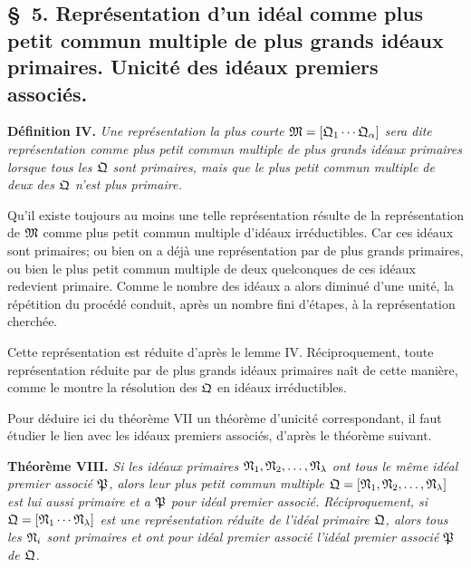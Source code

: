 \subsection*{\S~5. Représentation d'un idéal comme plus petit commun multiple de plus grands idéaux primaires. Unicité des idéaux premiers associés.}

\textbf{Définition IV.} \emph{Une représentation la plus courte $\mathfrak{M}=[\mathfrak{Q}_1\cdots\mathfrak{Q}_\alpha]$ sera dite représentation comme plus petit commun multiple de plus grands idéaux primaires lorsque tous les $\mathfrak{Q}$ sont primaires, mais que le plus petit commun multiple de deux des $\mathfrak{Q}$ n'est plus primaire.}

Qu'il existe toujours au moins une telle représentation résulte de la représentation de $\mathfrak{M}$ comme plus petit commun multiple d'idéaux irréductibles. Car ces idéaux sont primaires; ou bien on a déjà une représentation par de plus grands primaires, ou bien le plus petit commun multiple de deux quelconques de ces idéaux redevient primaire. Comme le nombre des idéaux a alors diminué d'une unité, la répétition du procédé conduit, après un nombre fini d'étapes, à la représentation cherchée.

Cette représentation est réduite d'après le lemme IV. Réciproquement, toute représentation réduite par de plus grands idéaux primaires naît de cette manière, comme le montre la résolution des $\mathfrak{Q}$ en idéaux irréductibles.

Pour déduire ici du théorème VII un théorème d'unicité correspondant, il faut étudier le lien avec les idéaux premiers associés, d'après le théorème suivant.

\textbf{Théorème VIII.} \emph{Si les idéaux primaires $\mathfrak{N}_1,\mathfrak{N}_2,\ldots,\mathfrak{N}_\lambda$ ont tous le même idéal premier associé $\mathfrak{P}$, alors leur plus petit commun multiple $\mathfrak{Q}=[\mathfrak{N}_1,\mathfrak{N}_2,\ldots,\mathfrak{N}_\lambda]$ est lui aussi primaire et a $\mathfrak{P}$ pour idéal premier associé. Réciproquement, si $\mathfrak{Q}=[\mathfrak{N}_1\cdots\mathfrak{N}_\lambda]$ est une représentation réduite de l'idéal primaire $\mathfrak{Q}$, alors tous les $\mathfrak{N}_i$ sont primaires et ont pour idéal premier associé l'idéal premier associé $\mathfrak{P}$ de $\mathfrak{Q}$.}

